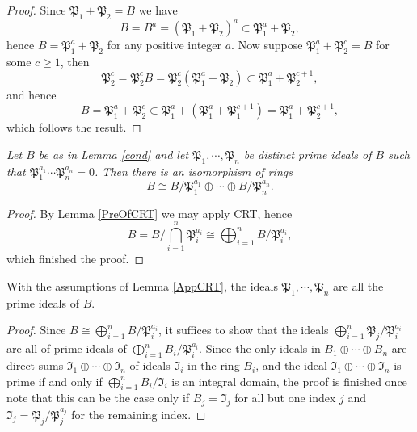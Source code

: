 \begin{proof}
Since $\mathfrak{P}_1+\mathfrak{P}_2=B$ we have 
$$
B=B^a=\left( \mathfrak{P} _1+\mathfrak{P} _2 \right) ^a\subset \mathfrak{P} _{1}^{a}+\mathfrak{P} _2,
$$
hence $B=\mathfrak{P}_1^a+\mathfrak{P}_2$ for any positive integer $a$. Now suppose $\mathfrak{P}_1^a+\mathfrak{P}_2^c=B$ for some $c\ge 1$, then 
$$
\mathfrak{P} _{2}^{c}=\mathfrak{P} _{2}^{c}B=\mathfrak{P} _{2}^{c}\left( \mathfrak{P} _{1}^{a}+\mathfrak{P} _2 \right) \subset \mathfrak{P} _{1}^{a}+\mathfrak{P} _{2}^{c+1},
$$
and hence 
$$
B=\mathfrak{P} _{1}^{a}+\mathfrak{P} _{2}^{c}\subset \mathfrak{P} _{1}^{a}+\left( \mathfrak{P} _{1}^{a}+\mathfrak{P} _{1}^{c+1} \right) =\mathfrak{P} _{1}^{a}+\mathfrak{P} _{2}^{c+1},
$$
which follows the result.
\end{proof}
\begin{lemma}\em\label{AppCRT}
Let $B$ be as in Lemma \ref{cond} and let $\mathfrak{P}_1,\cdots,\mathfrak{P}_n$ be distinct prime ideals of $B$ such that $\mathfrak{P}_1^{a_1}\cdots\mathfrak{P}_n^{a_n}=0$. Then there is an isomorphism of rings 
$$
B\cong B/\mathfrak{P} _{1}^{a_1}\oplus \cdots \oplus B/\mathfrak{P} _{n}^{a_n}.
$$
\end{lemma}
\begin{proof}
By Lemma \ref{PreOfCRT} we may apply CRT, hence 
$$
B=B/\bigcap_{i=1}^n{\mathfrak{P} _{i}^{a_i}}\cong \bigoplus_{i=1}^n{B/\mathfrak{P} _{i}^{a_i}},
$$
which finished the proof.
\end{proof}
\begin{corollary}\label{allprimes}
With the assumptions of Lemma \ref{AppCRT}, the ideals $\mathfrak{P}_1,\cdots,\mathfrak{P}_n$ are all the prime ideals of $B$.
\end{corollary}
\begin{proof}
Since $B\cong\bigoplus_{i=1}^nB/\mathfrak{P}_i^{a_i}$, it suffices to show that the ideals $\bigoplus_{i=1}^n{\mathfrak{P} _j/\mathfrak{P} _{i}^{a_i}}$ are all of prime ideals of $\bigoplus_{i=1}^nB_i/\mathfrak{P}_i^{a_i}$. Since the only ideals in $B_1\oplus\cdots\oplus B_n$ are direct sums $\mathfrak{I}_1\oplus\cdots\oplus\mathfrak{I}_n$ of ideals $\mathfrak{I}_i$ in the ring $B_i$, and the ideal $\mathfrak{I}_1\oplus\cdots\oplus\mathfrak{I}_n$ is prime if and only if $\bigoplus_{i=1}^nB_i/\mathfrak{I}_i$ is an integral domain, the proof is finished once note that this can be the case only if $B_j=\mathfrak{I}_j$ for all but one index $j$ and $\mathfrak{I}_j=\mathfrak{P}_j/\mathfrak{P}_j^{a_j}$ for the remaining index.
\end{proof}
